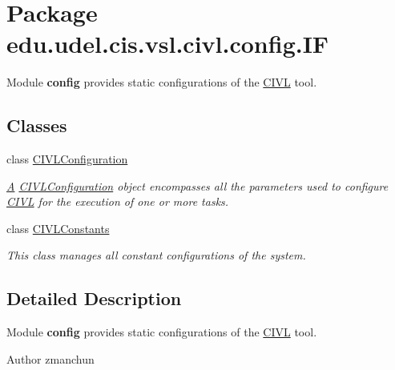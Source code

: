 \hypertarget{namespaceedu_1_1udel_1_1cis_1_1vsl_1_1civl_1_1config_1_1IF}{}\section{Package edu.\+udel.\+cis.\+vsl.\+civl.\+config.\+I\+F}
\label{namespaceedu_1_1udel_1_1cis_1_1vsl_1_1civl_1_1config_1_1IF}


Module {\bfseries config} provides static configurations of the \hyperlink{classedu_1_1udel_1_1cis_1_1vsl_1_1civl_1_1CIVL}{C\+I\+V\+L} tool.  


\subsection*{Classes}
\begin{DoxyCompactItemize}
\item 
class \hyperlink{classedu_1_1udel_1_1cis_1_1vsl_1_1civl_1_1config_1_1IF_1_1CIVLConfiguration}{C\+I\+V\+L\+Configuration}
\begin{DoxyCompactList}\small\item\em \hyperlink{structA}{A} \hyperlink{classedu_1_1udel_1_1cis_1_1vsl_1_1civl_1_1config_1_1IF_1_1CIVLConfiguration}{C\+I\+V\+L\+Configuration} object encompasses all the parameters used to configure \hyperlink{classedu_1_1udel_1_1cis_1_1vsl_1_1civl_1_1CIVL}{C\+I\+V\+L} for the execution of one or more tasks. \end{DoxyCompactList}\item 
class \hyperlink{classedu_1_1udel_1_1cis_1_1vsl_1_1civl_1_1config_1_1IF_1_1CIVLConstants}{C\+I\+V\+L\+Constants}
\begin{DoxyCompactList}\small\item\em This class manages all constant configurations of the system. \end{DoxyCompactList}\end{DoxyCompactItemize}


\subsection{Detailed Description}
Module {\bfseries config} provides static configurations of the \hyperlink{classedu_1_1udel_1_1cis_1_1vsl_1_1civl_1_1CIVL}{C\+I\+V\+L} tool. 

\begin{DoxyAuthor}{Author}
zmanchun 
\end{DoxyAuthor}
